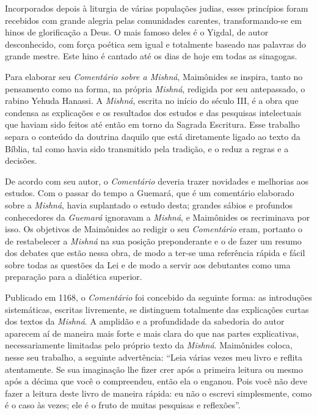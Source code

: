 Incorporados depois à liturgia de várias populações judias, esses
princípios foram recebidos com grande alegria pelas comunidades
carentes, transformando-se em hinos de glorificação a Deus. O mais
famoso deles é o Yigdal, de autor desconhecido, com força poética sem
igual e totalmente baseado nas palavras do grande mestre. Este hino é
cantado até os dias de hoje em todas as sinagogas.

Para elaborar seu \emph{Comentário sobre a Mishná}, Maimônides se
inspira, tanto no pensamento como na forma, na própria \emph{Mishná},
redigida por
seu antepassado, o rabino Yehuda Hanassi. A \emph{Mishná}, escrita no
início do século III, é a obra que condensa as explicações e os
resultados dos estudos e das pesquisas intelectuais que haviam sido
feitos até então em torno da Sagrada Escritura. Esse trabalho separa o
conteúdo da doutrina daquilo que está diretamente ligado ao texto da
Bíblia, tal como havia sido transmitido pela tradição, e o reduz a
regras e a decisões.

De acordo com seu autor, o \emph{Comentário} deveria trazer novidades e
melhorias aos estudos. Com o passar do tempo a Guemará, que é um
comentário elaborado sobre a \emph{Mishná}, havia suplantado o estudo
desta; grandes sábios e profundos conhecedores da \emph{Guemará}
ignoravam a \emph{Mishná}, e Maimônides os recriminava por isso. Os
objetivos de Maimônides ao redigir o seu \emph{Comentário} eram,
portanto o de restabelecer a \emph{Mishná} na sua posição preponderante
e o de fazer um resumo dos debates que estão nessa obra, de modo a
ter-se uma referência rápida e fácil sobre todas as questões da Lei e de
modo a servir aos debutantes como uma preparação para a dialética
superior.

Publicado em 1168, o \emph{Comentário} foi concebido da seguinte forma:
as introduções sistemáticas, escritas livremente, se distinguem
totalmente das explicações curtas dos textos da \emph{Mishná}. A
amplidão e a profundidade da sabedoria do autor aparecem aí de maneira
mais forte e mais clara do que nas partes explicativas, necessariamente
limitadas pelo próprio texto da \emph{Mishná}. Maimônides coloca, nesse
seu trabalho, a seguinte advertência: ``Leia várias vezes meu livro e
reflita atentamente. Se sua imaginação lhe fizer crer após a primeira
leitura ou mesmo após a décima que você o compreendeu, então ela o
enganou. Pois você não deve fazer a leitura deste livro de maneira
rápida: eu não o escrevi simplesmente, como é o caso às vezes; ele é o
fruto de muitas pesquisas e reflexões''.

